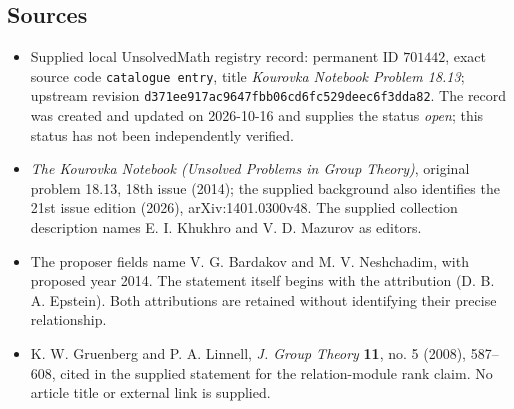 \documentclass[11pt]{article}
\begin{document}
\subsection{Sources}
\begin{itemize}
\item Supplied local UnsolvedMath registry record: permanent ID \(701442\), exact source code \texttt{catalogue entry}, title \emph{Kourovka Notebook Problem 18.13}; upstream revision \texttt{d371ee917ac9647fbb06cd6fc529deec6f3dda82}. The record was created and updated on 2026-10-16 and supplies the status \emph{open}; this status has not been independently verified.
\item \emph{The Kourovka Notebook (Unsolved Problems in Group Theory)}, original problem 18.13, 18th issue (2014); the supplied background also identifies the 21st issue edition (2026), arXiv:1401.0300v48. The supplied collection description names E. I. Khukhro and V. D. Mazurov as editors.
\item The proposer fields name V. G. Bardakov and M. V. Neshchadim, with proposed year 2014. The statement itself begins with the attribution \textnormal{(D. B. A. Epstein)}. Both attributions are retained without identifying their precise relationship.
\item K. W. Gruenberg and P. A. Linnell, \emph{J. Group Theory} \textbf{11}, no. 5 (2008), 587--608, cited in the supplied statement for the relation-module rank claim. No article title or external link is supplied.
\end{itemize}
\end{document}
